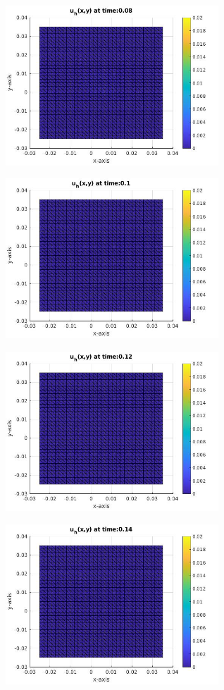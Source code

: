 \documentclass[a4paper,11pt]{article}
\begin{document}
\begin{figure}[h]
\begin{subfigure}{0.4\textwidth}
		\includegraphics[width =8cm]{./tc1-1/008.jpg}
	\end{subfigure}
	\begin{subfigure}{0.4\textwidth}
		\includegraphics[width = 8cm]{./tc1-1/010.jpg}
	\end{subfigure}
	\begin{subfigure}{0.4\textwidth}
		\includegraphics[width =8cm]{./tc1-1/012.jpg}
	\end{subfigure}
	\begin{subfigure}{0.4\textwidth}
		\includegraphics[width = 8cm]{./tc1-1/014.jpg}

\end{subfigure}
\end{figure}
\end{document}
